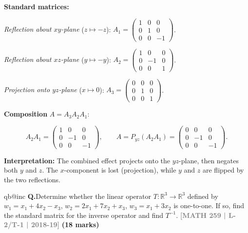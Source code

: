 \documentclass[12pt,a3paper]{article}
\makeatletter
\newcommand{\yr}[1]{\hfill\textcolor{gray}{\small\textbf{[#1]}}}
\newcommand{\mk}[1]{\textcolor{orange!70!black}{\small\textbf{(#1 marks)}}}
\newcounter{qnum}
\newcommand{\Q}[1]{%
  \csname qb@inc\endcsname
  \needspace{4\baselineskip}
  \refstepcounter{qnum}
  \vspace{6pt}
  \noindent\textbf{Q\theqnum.}\enspace #1\par
}
\makeatother
\begin{document}
\begin{tcolorbox}[enhanced,breakable,
  colback=cF!4,colframe=cF,boxrule=0.8pt,arc=5pt,
  title={\textbf{Answer --- Composition: Reflect$(xy)$ $\to$ Reflect$(xz)$ $\to$ Project$(yz)$}},
  fonttitle=\bfseries\color{white},colbacktitle=cF]

\textbf{Standard matrices:}

\textit{Reflection about $xy$-plane} ($z\mapsto-z$):
$A_1=\begin{pmatrix}1&0&0\\0&1&0\\0&0&-1\end{pmatrix}$.

\textit{Reflection about $xz$-plane} ($y\mapsto-y$):
$A_2=\begin{pmatrix}1&0&0\\0&-1&0\\0&0&1\end{pmatrix}$.

\textit{Projection onto $yz$-plane} ($x\mapsto0$):
$A_3=\begin{pmatrix}0&0&0\\0&1&0\\0&0&1\end{pmatrix}$.

\textbf{Composition} $A=A_3A_2A_1$:

\[
A_2A_1=\begin{pmatrix}1&0&0\\0&-1&0\\0&0&-1\end{pmatrix},
\qquad
A=P_{yz}(A_2A_1)=\begin{pmatrix}0&0&0\\0&-1&0\\0&0&-1\end{pmatrix}.
\]

\textbf{Interpretation:} The combined effect projects onto the $yz$-plane, then negates both $y$ and $z$. The $x$-component is lost (projection), while $y$ and $z$ are flipped by the two reflections.

\end{tcolorbox}


\Q{Determine whether the linear operator $T: \mathbb{R}^3 \to \mathbb{R}^3$ defined by $w_1 = x_1 + 4x_2 - x_3$, $w_2 = 2x_1 + 7x_2 + x_3$, $w_3 = x_1 + 3x_2$ is one-to-one. If so, find the standard matrix for the inverse operator and find $T^{-1}$.
\yr{MATH 259 | L-2/T-1 | 2018-19} \mk{18}}
\end{document}
